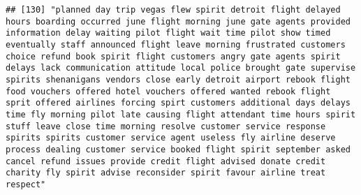 \documentclass[
]{article}
\begin{document}
\begin{verbatim}
## [130] "planned day trip vegas flew spirit detroit flight delayed hours boarding occurred june flight morning june gate agents provided information delay waiting pilot flight wait time pilot show timed eventually staff announced flight leave morning frustrated customers choice refund book spirit flight customers angry gate agents spirit delays lack communication attitude local police brought gate supervise spirits shenanigans vendors close early detroit airport rebook flight food vouchers offered hotel vouchers offered wanted rebook flight sprit offered airlines forcing spirt customers additional days delays time fly morning pilot late causing flight attendant time hours spirit stuff leave close time morning resolve customer service response spirits spirits customer service agent useless fly airline deserve process dealing customer service booked flight spirit september asked cancel refund issues provide credit flight advised donate credit charity fly spirit advise reconsider spirit favour airline treat respect"                                                                                                                                                                                                                                                                                                                                                                                                                                                                                                                                                                                                                                                                                                                                    

\end{verbatim}
\end{document}
